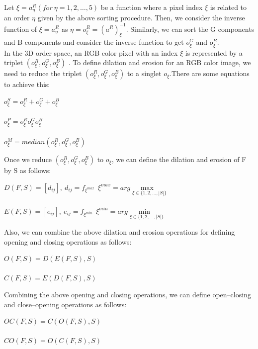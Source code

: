  Let $\xi=a_{\eta}^{R} (for\ \eta=1,2,\ldots,5)$
 be a function where a pixel index $\xi$ is related to an order $\eta$
 given by the above sorting procedure. 
 Then, we consider the inverse function of $\xi=a_{\eta}^{R}$
 as $\eta=o_{\xi}^{R} = (a^{R})_{\xi}^{-1}$. Similarly, we can sort the G components and B components and consider the inverse function to get $o_{\xi}^{G}$ and $o_{\xi}^{B}$.\\
 
 In the 3D order space, an RGB color pixel with an index $\xi$
 is represented by a triplet $(o_{\xi}^{R}, o_{\xi}^{G}, o_{\xi}^{B})$
. To define dilation and erosion for an RGB color image, we need to reduce the triplet $(o_{\xi}^{R}, o_{\xi}^{G}, o_{\xi}^{B})$ to a singlet $o_{\xi}$.There are some equations to achieve this:
\begin{center}
$o_{\xi}^{S}=o_{\xi}^{R}+o_{\xi}^{G}+o_{\xi}^{B}$\\
\
\\
$o_{\xi}^{P}=o_{\xi}^{R}o_{\xi}^{G}o_{\xi}^{B}$\\
\
\\
$o_{\xi}^{M}=median(o_{\xi}^{R},o_{\xi}^{G},o_{\xi}^{B})$
\\
\end{center}
Once we reduce $(o_{\xi}^{R}, o_{\xi}^{G}, o_{\xi}^{B})$ to $o_{\xi}$, we can define the dilation and erosion of F by S as follows:
\begin{center}
$D(F,S) = [d_{ij}], \  d_{ij}=f_{\xi^{max}}\ \ \xi^{max}=arg \mathop{max\ \ o_{\xi}}\limits_{\xi\in\{1,2,\ldots,|S|\}} $
\\
\ 
\\
$E(F,S) = [e_{ij}], \  e_{ij}=f_{\xi^{min}}\ \ \xi^{min}=arg \mathop{min\ \ o_{\xi}}\limits_{\xi\in\{1,2,\ldots,|S|\}} $
\end{center}
Also, we can combine the above dilation and erosion operations for defining opening and closing operations as follows:
\begin{center}
$O(F,S)=D(E(F,S),S)$
\\
\ 
\\
$C(F,S)=E(D(F,S),S)$
\end{center}
Combining the above opening and closing operations, we can define open–closing and close–opening operations as follows:
\begin{center}
$OC(F,S)=C(O(F,S),S)$
\\
\ 
\\
$CO(F,S)=O(C(F,S),S)$
\end{center}


